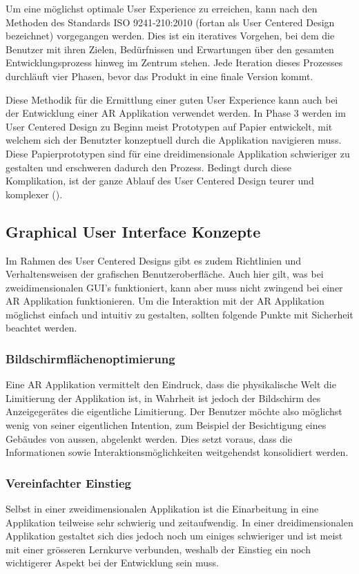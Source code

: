 \documentclass[a4paper]{scrreprt}
\begin{document}
Um eine möglichst optimale User Experience zu erreichen, kann nach den Methoden des Standards ISO 9241-210:2010 (fortan als User Centered Design bezeichnet) vorgegangen werden. Dies ist ein iteratives Vorgehen, bei dem die Benutzer mit ihren Zielen, Bedürfnissen und Erwartungen über den gesamten Entwicklungsprozess hinweg im Zentrum stehen.
Jede Iteration dieses Prozesses durchläuft vier Phasen, bevor das Produkt in eine finale Version kommt.

Diese Methodik für die Ermittlung einer guten User Experience kann auch bei der Entwicklung einer AR Applikation verwendet werden.
In Phase 3 werden im User Centered Design zu Beginn meist Prototypen auf Papier entwickelt, mit welchem sich der Benutzter konzeptuell durch die Applikation navigieren muss. Diese Papierprototypen sind für eine dreidimensionale Applikation schwieriger zu gestalten und erschweren dadurch den Prozess. Bedingt durch diese Komplikation, ist der ganze Ablauf des User Centered Design teurer und komplexer (\cite{ISO9241}).

\subsection{Graphical User Interface Konzepte}
\label{ch:GraphicalUserInterface}
Im Rahmen des User Centered Designs gibt es zudem Richtlinien und Verhaltensweisen der grafischen Benutzeroberfläche.
Auch hier gilt, was bei zweidimensionalen GUI's funktioniert, kann aber muss nicht zwingend bei einer AR Applikation funktionieren. Um die Interaktion mit der AR Applikation möglichst einfach und intuitiv zu gestalten, sollten folgende Punkte mit Sicherheit beachtet werden.

\subsubsection{Bildschirmflächenoptimierung}
Eine AR Applikation vermittelt den Eindruck, dass die physikalische Welt die Limitierung der Applikation ist, in Wahrheit ist jedoch der Bildschirm des Anzeigegerätes die eigentliche Limitierung.
Der Benutzer möchte also möglichst wenig von seiner eigentlichen Intention, zum Beispiel der Besichtigung eines Gebäudes von aussen, abgelenkt werden. Dies setzt voraus, dass die Informationen sowie Interaktionsmöglichkeiten weitgehendst konsolidiert werden.

\subsubsection{Vereinfachter Einstieg}
Selbst in einer zweidimensionalen Applikation ist die Einarbeitung in eine Applikation teilweise sehr schwierig und zeitaufwendig. In einer dreidimensionalen Applikation gestaltet sich dies jedoch noch um einiges schwieriger und ist meist mit einer grösseren Lernkurve verbunden, weshalb der Einstieg ein noch wichtigerer Aspekt bei der Entwicklung sein muss.
\end{document}
